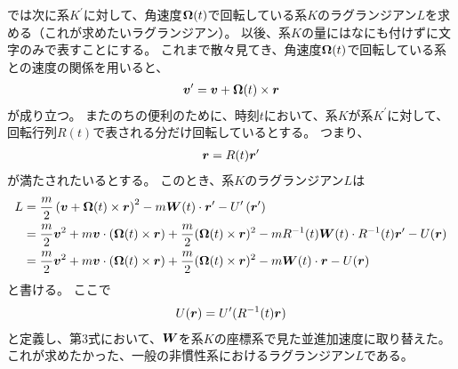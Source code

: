 \documentclass[a4paper]{jsarticle}
\def\vec#1{\mbox{\boldmath $#1$}}
\begin{document}
では次に系$K^{\prime}$に対して、角速度$\vec{\Omega}(t)$で回転している系$K$のラグランジアン$L$を求める（これが求めたいラグランジアン）。
以後、系$K$の量にはなにも付けずに文字のみで表すことにする。
これまで散々見てき、角速度$\vec{\Omega}(t)$で回転している系との速度の関係を用いると、
\begin{align}
	\vec{v}^{\prime} = \vec{v} + \vec{\Omega}(t) \times \vec{r}
\end{align}
が成り立つ。
またのちの便利のために、時刻$t$において、系$K$が系$K^{\prime}$に対して、回転行列$R(t)$で表される分だけ回転しているとする。
つまり、
\begin{align}
	\vec{r} = R(t) \vec{r}^{\prime}
\end{align}
が満たされたいるとする。
このとき、系$K$のラグランジアン$L$は
\begin{align}
	L &= \frac{m}{2} \left( \vec{v} + \vec{\Omega}(t) \times \vec{r} \right)^2
	- m \vec{W}(t) \cdot \vec{r}^{\prime}
	- U^{\prime} \left( \vec{r}^{\prime} \right) \\
	&= \frac{m}{2} \vec{v}^2 + m \vec{v} \cdot (\vec{\Omega}(t) \times \vec{r})
	+ \frac{m}{2} (\vec{\Omega}(t) \times \vec{r})^2
	- m R^{-1}(t) \vec{W}(t) \cdot R^{-1}(t) \vec{r}^{\prime} - U(\vec{r}) \\
	&= \frac{m}{2} \vec{v}^2 + m \vec{v} \cdot (\vec{\Omega}(t) \times \vec{r})
	+ \frac{m}{2} (\vec{\Omega}(t) \times \vec{r})^2 - m \vec{W}(t) \cdot \vec{r}
	- U(\vec{r})
\end{align}
と書ける。
ここで
\begin{align}
	U(\vec{r}) = U^{\prime}(R^{-1}(t) \vec{r})
\end{align}
と定義し、第3式において、$\vec{W}$を系$K$の座標系で見た並進加速度に取り替えた。
これが求めたかった、一般の非慣性系におけるラグランジアン$L$である。
\end{document}
